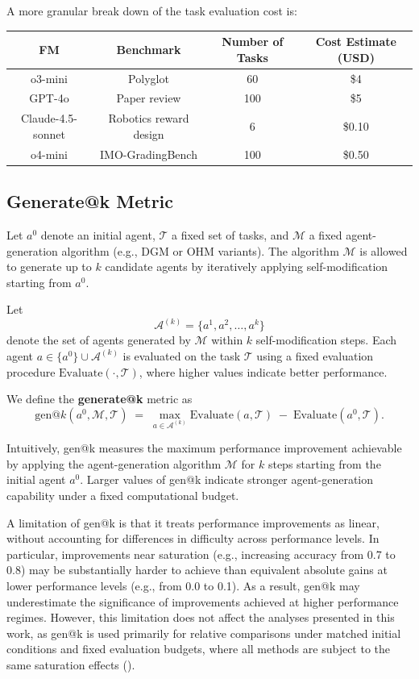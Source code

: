 \documentclass[]{fairmeta}
\begin{document}
A more granular break down of the task evaluation cost is:

\begin{table}[H]
\centering
\begin{tabular}{@{}cccc@{}}
\toprule
\textbf{FM} & \textbf{Benchmark} & \textbf{Number of Tasks} & \textbf{Cost Estimate (USD)} \\ \midrule
o3-mini & Polyglot & 60 & \$4 \\
GPT-4o & Paper review & 100 & \$5 \\
Claude-4.5-sonnet & Robotics reward design & 6 & \$0.10 \\
o4-mini & IMO-GradingBench & 100 & \$0.50 \\ \bottomrule
\end{tabular}
\end{table}

\subsection{Generate@k Metric}
\label{app:genk-metric}

Let $a^{0}$ denote an initial agent, $\mathcal{T}$ a fixed set of tasks, and $\mathcal{M}$ a fixed agent-generation algorithm (e.g., DGM or OHM variants). The algorithm $\mathcal{M}$ is allowed to generate up to $k$ candidate agents by iteratively applying self-modification starting from $a^{0}$.

Let
\[
\mathcal{A}^{(k)} = \{a^{1}, a^{2}, \dots, a^{k}\}
\]
denote the set of agents generated by $\mathcal{M}$ within $k$ self-modification steps. Each agent
$a \in \{a^{0}\} \cup \mathcal{A}^{(k)}$ is evaluated on the task $\mathcal{T}$ using a fixed evaluation
procedure $\mathrm{Evaluate}(\cdot, \mathcal{T})$, where higher values indicate better performance.

We define the \textbf{generate@k} metric as
\[
\mathrm{gen@}k(a^{0}, \mathcal{M}, \mathcal{T})
\;=\;
\max_{a \in \mathcal{A}^{(k)}} \mathrm{Evaluate}(a, \mathcal{T})
\;-\;
\mathrm{Evaluate}(a^{0}, \mathcal{T}).
\]

Intuitively, gen@k measures the maximum performance improvement achievable by applying the agent-generation algorithm $\mathcal{M}$ for $k$ steps starting from the initial agent $a^{0}$. Larger values of gen@k indicate stronger agent-generation capability under a fixed computational budget.

A limitation of gen@k is that it treats performance improvements as linear, without accounting for differences in difficulty across performance levels. In particular, improvements near saturation (e.g., increasing accuracy from 0.7 to 0.8) may be substantially harder to achieve than equivalent absolute gains at lower performance levels (e.g., from 0.0 to 0.1). As a result, gen@k may underestimate the significance of improvements achieved at higher performance regimes. However, this limitation does not affect the analyses presented in this work, as gen@k is used primarily for relative comparisons under matched initial conditions and fixed evaluation budgets, where all methods are subject to the same saturation effects ().
\end{document}
